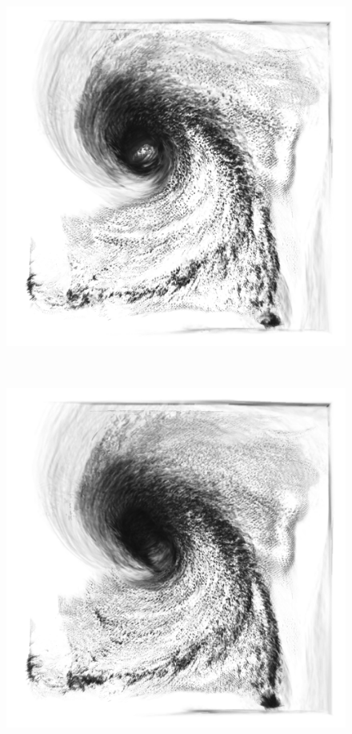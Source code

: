 \begin{figure}
\centering
\begin{minipage}{.33\textwidth}
	\includegraphics[width=1\linewidth]{figures/hurricane_std5_gray_40}
	\subcaption{}
\end{minipage}~
\begin{minipage}{.33\textwidth}
	\includegraphics[width=1\linewidth]{figures/hurricane_std10_gray_40}

\end{minipage}
\end{figure}
